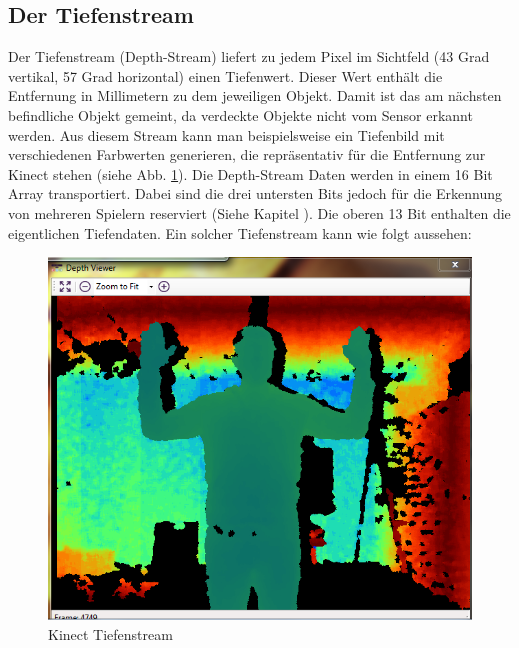 \subsection{Der Tiefenstream}
Der Tiefenstream (Depth-Stream) liefert zu jedem Pixel im Sichtfeld (43 Grad vertikal, 57 Grad horizontal) einen Tiefenwert. Dieser Wert enthält die Entfernung in Millimetern zu dem jeweiligen Objekt.
Damit ist das am nächsten befindliche Objekt gemeint, da verdeckte Objekte nicht vom Sensor erkannt werden.
Aus diesem Stream kann man beispielsweise ein Tiefenbild mit verschiedenen Farbwerten generieren, die repräsentativ für die Entfernung zur Kinect stehen (siehe Abb. \ref{f:kinect_depth_stream}). Die Depth-Stream Daten werden in einem 16 Bit Array transportiert. Dabei sind die drei untersten Bits jedoch für die Erkennung von mehreren Spielern reserviert
(Siehe Kapitel ). Die oberen 13 Bit enthalten die eigentlichen Tiefendaten. Ein solcher Tiefenstream kann wie folgt aussehen:

\begin{figure}[H]						
	\centering							
	\includegraphics[scale=0.5]{Bilder/kinect_tiefenstream.png}			
	\caption{Kinect Tiefenstream}						
	\label{f:kinect_depth_stream}						
\end{figure}

